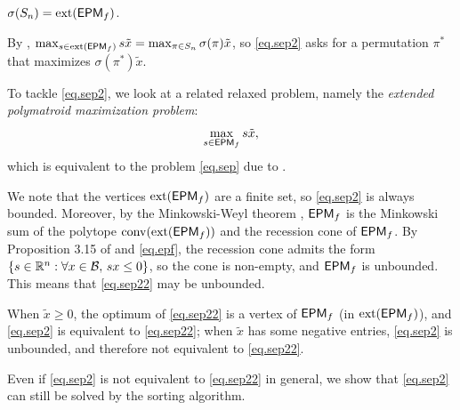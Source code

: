 \begin{lemma}
\label{lem.subvert}
$\sigma(S_n) = \operatorname{ext}(\mathsf{EPM}_{f})$.
\end{lemma}
  
  By ,  $ \max_{s \in \operatorname{ext}(\mathsf{EPM}_{f})} s \tilde{x} = \max_{\pi \in S_n} \sigma(\pi)\tilde{x}$, so \eqref{eq.sep2} asks for a permutation $\pi^\ast$ that maximizes $\sigma(\pi^\ast)\tilde{x}$.
 
 
To tackle \eqref{eq.sep2}, we  look at a related relaxed problem, namely the \textit{extended polymatroid maximization problem}:
\begin{equation}
\label{eq.sep22}
    \max_{s \in \mathsf{EPM}_{f}} s \tilde{x},
\end{equation}
which is equivalent to the problem \eqref{eq.sep} due to .

We note that the vertices $ \operatorname{ext}(\mathsf{EPM}_{f})$ are a finite set, so \eqref{eq.sep2} is always bounded. Moreover, by the Minkowski-Weyl theorem  \cite{conforti2014integer}, $\mathsf{EPM}_{f}$ is the Minkowski sum of the polytope  $\operatorname{conv}(\operatorname{ext}(\mathsf{EPM}_{f}))$ and the recession cone of $\mathsf{EPM}_{f}$. By Proposition 3.15 of \cite{conforti2014integer} and \eqref{eq.epf}, the  recession cone admits the form $\{s \in \mathbb R^n:\forall x \in \mathcal B,\, s  x \le 0\}$, so the cone is non-empty, and $\mathsf{EPM}_{f}$ is unbounded. This means that \eqref{eq.sep22} may be unbounded.
\begin{lemma}
\label{lem.notequi}
\label{lem.sort}
When $\tilde{x} \ge  0$,  the optimum of  \eqref{eq.sep22} is a vertex of $\mathsf{EPM}_{f}$ (\ie in $\operatorname{ext}(\mathsf{EPM}_{f})$), and \eqref{eq.sep2} is equivalent to \eqref{eq.sep22}; when $\tilde{x}$ has some negative entries,  \eqref{eq.sep2} is unbounded, and therefore not equivalent to  \eqref{eq.sep22}.
\end{lemma}
 Even if \eqref{eq.sep2} is not equivalent to \eqref{eq.sep22} in general, we show that \eqref{eq.sep2} can still be solved by the sorting algorithm.


